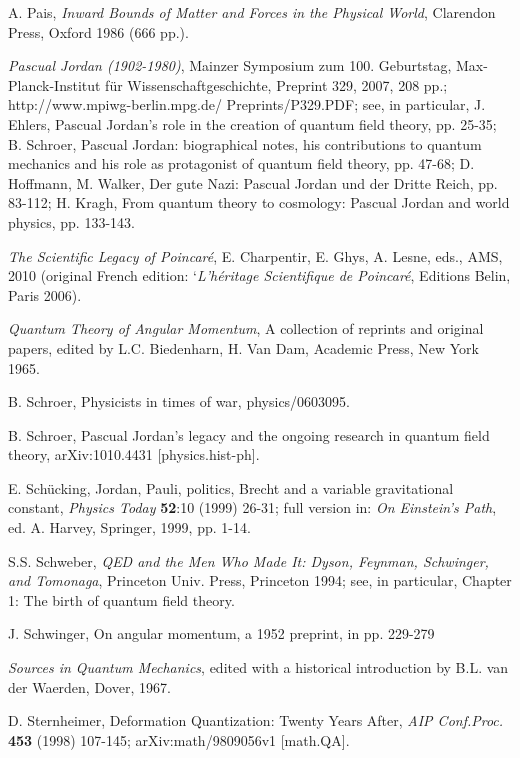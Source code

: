 \begin{thebibliography}{000}
 A. Pais, {\it Inward Bounds of Matter and Forces in the
Physical World}, Clarendon Press, Oxford 1986 (666 pp.).

 {\it Pascual Jordan (1902-1980)}, Mainzer Symposium zum
100. Geburtstag, Max-Planck-Institut f\"ur Wissenschaftgeschichte, Preprint 329,
 2007, 208 pp.; http://www.mpiwg-berlin.mpg.de/  Preprints/P329.PDF; see, in
particular, J. Ehlers, Pascual Jordan's role in the creation of quantum  field
theory, pp. 25-35; B. Schroer, Pascual Jordan: biographical notes, his
contributions to quantum mechanics and his role as protagonist of quantum field
 theory, pp. 47-68; D. Hoffmann, M. Walker, Der gute Nazi: Pascual Jordan und
der Dritte Reich, pp. 83-112; H. Kragh, From quantum theory to cosmology:
Pascual Jordan and world physics, pp. 133-143.

 {\it The Scientific Legacy of Poincar\'e}, E.
Charpentir, E. Ghys, A. Lesne, eds., AMS, 2010 (original French edition: 
`{\it L'h\'eritage Scientifique de Poincar\'e}, Editions Belin, Paris 2006).
 
 {\it Quantum Theory of Angular Momentum}, A collection of
reprints and original papers, edited by L.C. Biedenharn, H. Van Dam, Academic
Press, New York 1965.

 B. Schroer, Physicists in times of war, physics/0603095.

 B. Schroer, Pascual Jordan's legacy and the ongoing research
in quantum field theory, arXiv:1010.4431 [physics.hist-ph].

 E. Sch\"ucking, Jordan, Pauli, politics, Brecht and a
variable gravitational constant, {\it Physics Today} {\bf 52}:10 (1999) 26-31;
full version in: {\it On Einstein's Path}, ed. A. Harvey, Springer, 1999,
pp. 1-14.

 S.S. Schweber, {\it QED and the Men Who Made It: Dyson,
Feynman, Schwinger, and Tomonaga}, Princeton Univ. Press, Princeton 1994; see,
in particular, Chapter 1: The birth of quantum field theory.

 J. Schwinger, On angular momentum, a 1952 preprint, in
\cite{QTAM} pp. 229-279

 {\it Sources in Quantum Mechanics}, edited with a historical
introduction by B.L. van der Waerden, Dover, 1967.

 D. Sternheimer, Deformation Quantization: Twenty Years After,
{\it AIP Conf.Proc.} {\bf 453} (1998) 107-145; 	arXiv:math/9809056v1 [math.QA].


\end{thebibliography}
